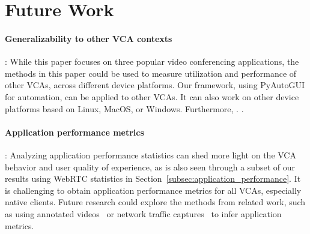 \section{Future Work}
\label{sec:discussion}

\paragraph{Generalizability to other VCA contexts}: While this paper focuses on
three popular video conferencing applications, the methods in this paper could
be used to measure utilization and performance of other VCAs, across different
device platforms. Our framework, using PyAutoGUI for automation, can be
applied to other VCAs. It can also work on other device platforms based on Linux,
MacOS, or Windows. 
Furthermore, . .

\paragraph{Application performance metrics}: Analyzing application performance
statistics can shed more light on the VCA behavior and user quality of
experience, as is also seen through a subset of our results using WebRTC
statistics in Section~\ref{subsec:application_performance}. It is challenging
to obtain application performance metrics for all VCAs, especially native
clients. Future research could explore the methods from related work, such as
using annotated videos~\cite{xu2012video} or network traffic
captures~\cite{dasari2018scalable} to infer application metrics.

